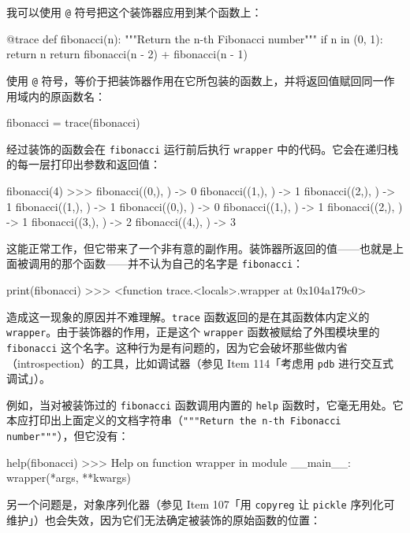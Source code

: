 我可以使用 \texttt{@} 符号把这个装饰器应用到某个函数上：

\begin{codebox}[python]
@trace
def fibonacci(n):
    """Return the n-th Fibonacci number"""
    if n in (0, 1):
        return n
    return fibonacci(n - 2) + fibonacci(n - 1)
\end{codebox}

使用 \texttt{@} 符号，等价于把装饰器作用在它所包装的函数上，并将返回值赋回同一作用域内的原函数名：

\begin{codebox}[python]
fibonacci = trace(fibonacci)
\end{codebox}

经过装饰的函数会在 \texttt{fibonacci} 运行前后执行 \texttt{wrapper} 中的代码。它会在递归栈的每一层打印出参数和返回值：

\begin{codebox}[python]
fibonacci(4)
>>>
fibonacci((0,), {}) -> 0
fibonacci((1,), {}) -> 1
fibonacci((2,), {}) -> 1
fibonacci((1,), {}) -> 1
fibonacci((0,), {}) -> 0
fibonacci((1,), {}) -> 1
fibonacci((2,), {}) -> 1
fibonacci((3,), {}) -> 2
fibonacci((4,), {}) -> 3
\end{codebox}

这能正常工作，但它带来了一个非有意的副作用。装饰器所返回的值——也就是上面被调用的那个函数——并不认为自己的名字是 \texttt{fibonacci}：

\begin{codebox}[python]
print(fibonacci)
>>>
<function trace.<locals>.wrapper at 0x104a179c0>
\end{codebox}

造成这一现象的原因并不难理解。\texttt{trace} 函数返回的是在其函数体内定义的 \texttt{wrapper}。由于装饰器的作用，正是这个 \texttt{wrapper} 函数被赋给了外围模块里的 \texttt{fibonacci} 这个名字。这种行为是有问题的，因为它会破坏那些做内省（introspection）的工具，比如调试器（参见 Item 114「考虑用 \texttt{pdb} 进行交互式调试」）。

例如，当对被装饰过的 \texttt{fibonacci} 函数调用内置的 \texttt{help} 函数时，它毫无用处。它本应打印出上面定义的文档字符串（\texttt{"""Return the n-th Fibonacci number"""}），但它没有：

\begin{codebox}[python]
help(fibonacci)
>>>
Help on function wrapper in module __main__:
wrapper(*args, **kwargs)
\end{codebox}

另一个问题是，对象序列化器（参见 Item 107「用 \texttt{copyreg} 让 \texttt{pickle} 序列化可维护」）也会失效，因为它们无法确定被装饰的原始函数的位置：

